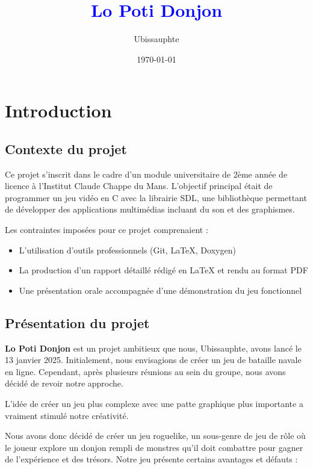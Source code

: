 \documentclass[a4paper,11pt]{article}
\begin{document}
\title{\huge{\textbf{\textcolor{blue}{Lo Poti Donjon}}}}
\author{\Large{Ubissauphte}}
\date{\today}
\maketitle
\newpage
\tableofcontents
\newpage

\section{Introduction}
\subsection{Contexte du projet}

Ce projet s'inscrit dans le cadre d'un module universitaire de 2ème année de licence à l'Institut Claude Chappe du Mans. L'objectif principal était de programmer un jeu vidéo en C avec la librairie SDL, une bibliothèque permettant de développer des applications multimédias incluant du son et des graphismes.

Les contraintes imposées pour ce projet comprenaient :
\begin{itemize}
    \item L'utilisation d'outils professionnels (Git, \LaTeX{}, Doxygen)
    \item La production d'un rapport détaillé rédigé en \LaTeX{} et rendu au format PDF
    \item Une présentation orale accompagnée d'une démonstration du jeu fonctionnel
\end{itemize}


\subsection{Présentation du projet}

\textbf{Lo Poti Donjon} est un projet ambitieux que nous, Ubissauphte, avons lancé le 13 janvier 2025. Initialement, nous envisagions de créer un jeu de bataille navale en ligne. Cependant, après plusieurs réunions au sein du groupe, nous avons décidé de revoir notre approche. 

L'idée de créer un jeu plus complexe avec une patte graphique plus importante a vraiment stimulé notre créativité.

Nous avons donc décidé de créer un jeu roguelike, un sous-genre de jeu de rôle où le joueur explore 
un donjon rempli de monstres qu'il doit combattre pour gagner de l'expérience et des trésors. Notre jeu présente certains avantages et défauts :
\end{document}
